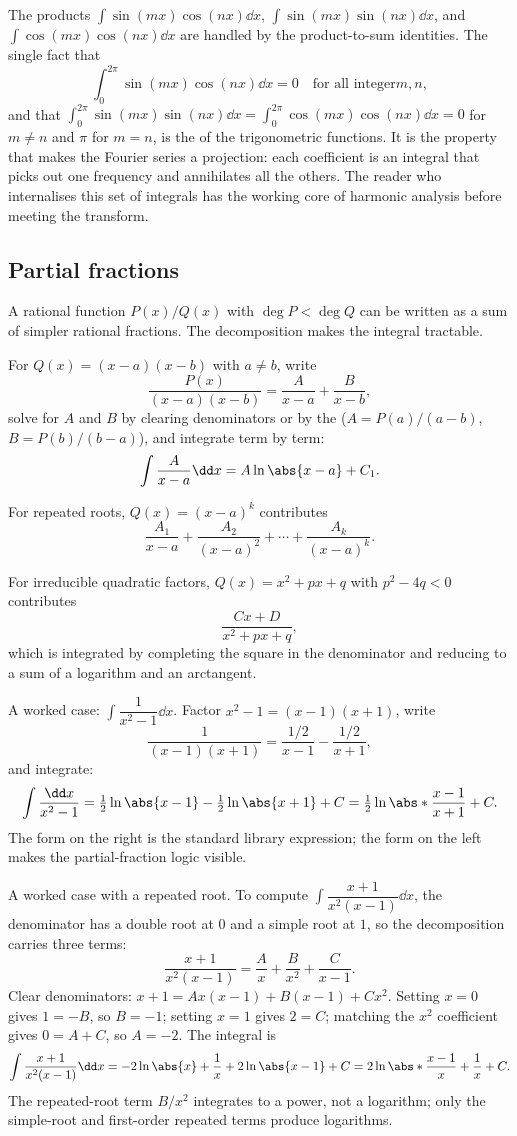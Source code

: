 The products $\int\sin(mx)\cos(nx)\dd x$, $\int\sin(mx)\sin(nx)\dd
x$, and $\int\cos(mx)\cos(nx)\dd x$ are handled by the
product-to-sum identities. The single fact that
\[
\int_{0}^{2\pi}\sin(mx)\cos(nx)\dd x = 0 \quad\text{for all integer
$m, n$},
\]
and that $\int_{0}^{2\pi}\sin(mx)\sin(nx)\dd x = \int_{0}^{2\pi}
\cos(mx)\cos(nx)\dd x = 0$ for $m \neq n$ and $\pi$ for $m = n$, is
the  of the trigonometric functions. It is
the property that makes the Fourier series a projection: each
coefficient is an integral that picks out one frequency and
annihilates all the others. The reader who internalises this set of
integrals has the working core of harmonic analysis before meeting
the transform.

\subsection{Partial fractions}

A rational function $P(x)/Q(x)$ with $\deg P < \deg Q$ can be
written as a sum of simpler rational fractions. The decomposition
makes the integral tractable.

For $Q(x) = (x - a)(x - b)$ with $a \neq b$, write
\[
\frac{P(x)}{(x-a)(x-b)} = \frac{A}{x-a} + \frac{B}{x-b},
\]
solve for $A$ and $B$ by clearing denominators or by the
 ($A = P(a)/(a-b)$, $B = P(b)/(b-a)$), and
integrate term by term:
\[
\int \frac{A}{x-a} \dd x = A \ln \abs{x-a} + C_{1}.
\]

For repeated roots, $Q(x) = (x - a)^{k}$ contributes
\[
\frac{A_{1}}{x-a} + \frac{A_{2}}{(x-a)^{2}} + \cdots +
\frac{A_{k}}{(x-a)^{k}}.
\]

For irreducible quadratic factors, $Q(x) = x^{2} + p x + q$ with
$p^{2} - 4q < 0$ contributes
\[
\frac{Cx + D}{x^{2} + p x + q},
\]
which is integrated by completing the square in the denominator
and reducing to a sum of a logarithm and an arctangent.

A worked case: $\int \dfrac{1}{x^{2} - 1} \dd x$. Factor
$x^{2} - 1 = (x-1)(x+1)$, write
\[
\frac{1}{(x-1)(x+1)} = \frac{1/2}{x-1} - \frac{1/2}{x+1},
\]
and integrate:
\[
\int \frac{\dd x}{x^{2} - 1} = \tfrac{1}{2}\ln\abs{x-1} -
\tfrac{1}{2}\ln\abs{x+1} + C =
\tfrac{1}{2}\ln\abs*{\frac{x-1}{x+1}} + C.
\]
The form on the right is the standard library expression; the
form on the left makes the partial-fraction logic visible.

A worked case with a repeated root. To compute $\int \dfrac{x +
1}{x^{2}(x - 1)}\dd x$, the denominator has a double root at $0$
and a simple root at $1$, so the decomposition carries three terms:
\[
\frac{x + 1}{x^{2}(x - 1)} = \frac{A}{x} + \frac{B}{x^{2}} +
\frac{C}{x - 1}.
\]
Clear denominators: $x + 1 = A x(x - 1) + B(x - 1) + Cx^{2}$.
Setting $x = 0$ gives $1 = -B$, so $B = -1$; setting $x = 1$ gives
$2 = C$; matching the $x^{2}$ coefficient gives $0 = A + C$, so
$A = -2$. The integral is
\[
\int\frac{x+1}{x^{2}(x-1)}\dd x = -2\ln\abs{x} + \frac{1}{x} +
2\ln\abs{x - 1} + C = 2\ln\abs*{\frac{x-1}{x}} + \frac{1}{x} + C.
\]
The repeated-root term $B/x^{2}$ integrates to a power, not a
logarithm; only the simple-root and first-order repeated terms
produce logarithms.

